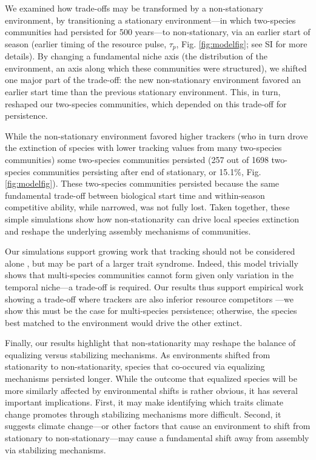 \documentclass[11pt,letterpaper]{article}
\begin{document}
We examined how trade-offs may be transformed by a non-stationary environment, by transitioning a stationary environment---in which two-species communities had persisted for 500 years---to non-stationary, via an earlier start of season (earlier timing of the resource pulse, $\tau_p$, Fig. \ref{fig:modelfig}; see SI for more details). By changing a fundamental niche axis (the distribution of the environment, an axis along which these communities were structured), we shifted one major part of the trade-off: the new non-stationary environment favored an earlier start time than the previous stationary environment. This, in turn, reshaped our two-species communities, which depended on this trade-off for persistence. 

While the non-stationary environment favored higher trackers (who in turn drove the extinction of species with lower tracking values from many two-species communities) some two-species communities persisted (257 out of 1698 two-species communities persisting after end of stationary, or 15.1\%, Fig. \ref{fig:modelfig}). These two-species communities persisted because the same fundamental trade-off between biological start time and within-season competitive ability, while narrowed, was not fully lost. Taken together, these simple simulations show how non-stationarity can drive local species extinction and reshape the underlying assembly mechanisms of communities.

Our simulations support growing work that tracking should not be considered alone \citep{Diamond:2011nx,Dorji2013,Ishioka2013,kharouba2014,du2017}, but may be part of a larger trait syndrome. Indeed, this model trivially shows that multi-species communities cannot form given only variation in the temporal niche---a trade-off is required. Our results thus support empirical work showing a trade-off where trackers are also inferior resource competitors \citep{lasky2016,Zhu2016BioLetters}---we show this must be the case for multi-species persistence; otherwise, the species best matched to the environment would drive the other extinct.

Finally, our results highlight that non-stationarity may reshape the balance of equalizing versus stabilizing mechanisms. As environments shifted from stationarity to non-stationarity, species that co-occured via equalizing mechanisms persisted longer. While the outcome that equalized species will be more similarly affected by environmental shifts is rather obvious, it has several important implications. First, it may make identifying which traits climate change promotes through stabilizing mechanisms more difficult. Second, it suggests climate change---or other factors that cause an environment to shift from stationary to non-stationary---may cause a fundamental shift away from assembly via stabilizing mechanisms. %
\end{document}
